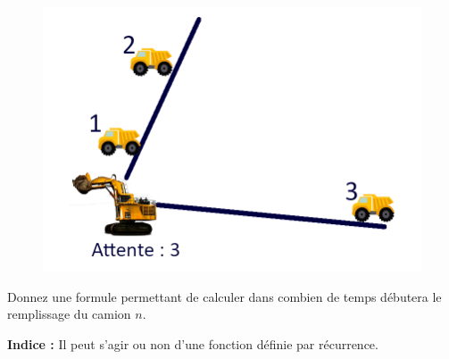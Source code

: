 	\begin{figure}
		\center
		\includegraphics[width=0.4\linewidth]{File.png}
		\caption{\label{fig:file}}
	\end{figure}
	
	Donnez une formule permettant de calculer dans combien de temps débutera le remplissage du camion $n$.
	
	\textbf{Indice :} Il peut s'agir ou non d'une fonction définie par récurrence.
	